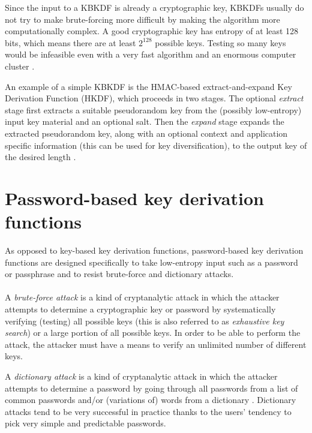 \documentclass[12pt,oneside]{fithesis2}
\begin{document}
      Since the input to a KBKDF is already a cryptographic key, KBKDFs usually do not try to make brute-forcing more difficult by making the algorithm more computationally complex. A good cryptographic key has entropy of at least 128 bits, which means there are at least $2^{128}$ possible keys. Testing so many keys would be infeasible even with a very fast algorithm and an enormous computer cluster \cite[section 7.1]{appliedCrypto}.
      
      An example of a simple KBKDF is the HMAC-based extract-and-expand Key Derivation Function (HKDF), which proceeds in two stages. The optional \emph{extract} stage first extracts a suitable pseudorandom key from the (possibly low-entropy) input key material and an optional salt. Then the \emph{expand} stage expands the extracted pseudorandom key, along with an optional context and application specific information (this can be used for key diversification), to the output key of the desired length \cite{hkdf, rfc5869}.
      
      \section{Password-based key derivation functions}\label{s:PBKDFs}
      As opposed to key-based key derivation functions, password-based key derivation functions are designed specifically to take low-entropy input such as a password or passphrase and to resist brute-force and dictionary attacks.
      
      \paragraph*{}
      A \emph{brute-force attack} is a kind of cryptanalytic attack in which the attacker attempts to determine a cryptographic key or password by systematically verifying (testing) all possible keys (this is also referred to as \emph{exhaustive key search}) \cite{appliedCrypto} or a large portion of all possible keys. In order to be able to perform the attack, the attacker must have a means to verify an unlimited number of different keys.
      
      A \emph{dictionary attack} is a kind of cryptanalytic attack in which the attacker attempts to determine a password by going through all passwords from a list of common passwords and/or (variations of) words from a dictionary \cite{appliedCrypto}. Dictionary attacks tend to be very successful in practice thanks to the users' tendency to pick very simple and predictable passwords.
      
\end{document}
